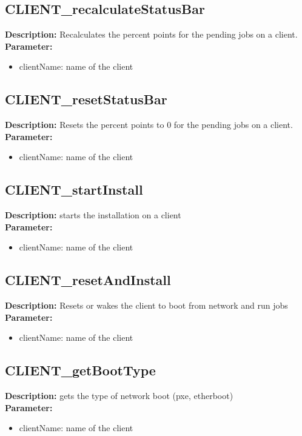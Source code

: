 \subsection{CLIENT\_recalculateStatusBar}
\textbf{Description:} Recalculates the percent points for the pending jobs on a client.\\
\textbf{Parameter:}
\begin{itemize}
\item clientName: name of the client
\end{itemize}

\subsection{CLIENT\_resetStatusBar}
\textbf{Description:} Resets the percent points to 0 for the pending jobs on a client.\\
\textbf{Parameter:}
\begin{itemize}
\item clientName: name of the client
\end{itemize}

\subsection{CLIENT\_startInstall}
\textbf{Description:} starts the installation on a client\\
\textbf{Parameter:}
\begin{itemize}
\item clientName: name of the client
\end{itemize}

\subsection{CLIENT\_resetAndInstall}
\textbf{Description:} Resets or wakes the client to boot from network and run jobs\\
\textbf{Parameter:}
\begin{itemize}
\item clientName: name of the client
\end{itemize}

\subsection{CLIENT\_getBootType}
\textbf{Description:} gets the type of network boot (pxe, etherboot)\\
\textbf{Parameter:}
\begin{itemize}
\item clientName: name of the client
\end{itemize}

